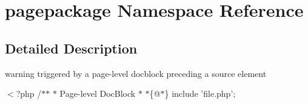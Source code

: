 \hypertarget{namespacepagepackage}{\section{pagepackage \-Namespace \-Reference}
\label{namespacepagepackage}
}


\subsection{\-Detailed \-Description}
warning triggered by a page-\/level docblock preceding a source element

{\ttfamily  $<$?php /$\ast$$\ast$ $\ast$ \-Page-\/level \-Doc\-Block $\ast$ $\ast$\{@$\ast$\} include 'file.\-php'; } 